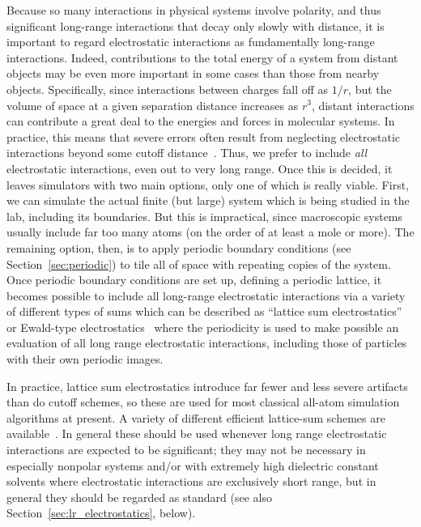 \documentclass[9pt,bestpractices]{livecoms}
\begin{document}
Because so many interactions in physical systems involve polarity, and thus significant long-range interactions that decay only slowly with distance, it is important to regard electrostatic interactions as fundamentally long-range interactions.
Indeed, contributions to the total energy of a system from distant objects may be even more important in some cases than those from nearby objects.
Specifically, since interactions between charges fall off as $1/r$, but the volume of space at a given separation distance increases as $r^3$, distant interactions can contribute a great deal to the energies and forces in molecular systems.
In practice, this means that severe errors often result from neglecting electrostatic interactions beyond some cutoff distance~\cite{LeachBook, York:1993:JChemPhys, Darden:1993:JChemPhys, Piana:2012:PLOSONE, Sagui:1999:AnnuRevBiophysBiomolStruct}. 
Thus, we prefer to include \emph{all} electrostatic interactions, even out to very long range. 
Once this is decided, it  leaves simulators with two main options, only one of which is really viable.
First, we can simulate the actual finite (but large) system which is being studied in the lab, including its boundaries.
But this is impractical, since macroscopic systems usually include far too many atoms (on the order of at least a mole or more).
The remaining option, then, is to apply periodic boundary conditions (see Section~\ref{sec:periodic}) to tile all of space with repeating copies of the system. 
Once periodic boundary conditions are set up, defining a periodic lattice, it becomes possible to include all long-range electrostatic interactions via a variety of different types of sums which can be described as ``lattice sum electrostatics'' or Ewald-type electrostatics~\cite{Sagui:1999:AnnuRevBiophysBiomolStruct, Cisneros:2014:ChemRev} where the periodicity is used to make possible an evaluation of all long range electrostatic interactions, including those of particles with their own periodic images.

In practice, lattice sum electrostatics introduce far fewer and less severe artifacts than do cutoff schemes, so these are used for most classical all-atom simulation algorithms at present. 
A variety of different efficient lattice-sum schemes are available~\cite{Cisneros:2014:ChemRev}.
In general these should be used whenever long range electrostatic interactions are expected to be significant; they may not be necessary in especially nonpolar systems and/or with extremely high dielectric constant solvents where electrostatic interactions are exclusively short range, but in general they should be regarded as standard (see also Section~\ref{sec:lr_electrostatics}, below). 
\end{document}
